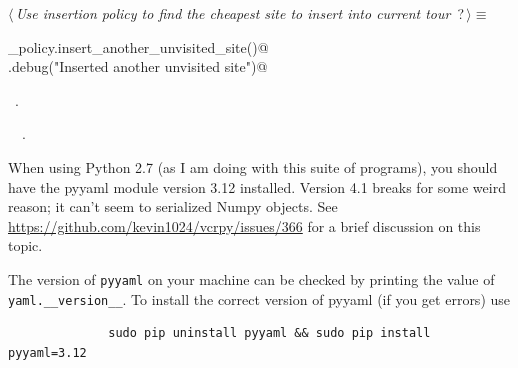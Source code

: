 \documentclass[11.5pt]{report}
\begin{document}
\begin{flushleft} \small\label{scrap25}\raggedright\small
{} $\langle\,${\itshape Use insertion policy to find the cheapest site to insert into current tour}\nobreak\ {\footnotesize {?}}$\,\rangle\equiv$
\vspace{-1ex}
\begin{list}{}{} \item
\mbox{}\verb@insertion_policy.insert_another_unvisited_site()@\\
\mbox{}\verb@logger.debug("Inserted another unvisited site")@\\
\mbox{}\verb@@{\NWsep}
\end{list}
\vspace{-1.5ex}
\footnotesize
\begin{list}{}{\setlength{\itemsep}{-\parsep}\setlength{\itemindent}{-\leftmargin}}
\item \NWtxtMacroRefIn\ .
\item \NWtxtIdentsUsed\nobreak\  \verb@logger@\nobreak\ .
\item{}
\end{list}
\vspace{4ex}
\end{flushleft}
\newchunk When using Python 2.7 (as I am doing with this suite of programs), you should have the 
pyyaml module version 3.12 installed. Version 4.1 breaks for some weird reason; it can't seem to serialized
Numpy objects. See \url{https://github.com/kevin1024/vcrpy/issues/366} for a brief discussion on this topic. 

The version of \verb|pyyaml| on your machine can be checked by printing the value of \verb|yaml.__version__|. 
To install the correct version of pyyaml (if you get errors)  use

\begin{verbatim} 
              sudo pip uninstall pyyaml && sudo pip install pyyaml=3.12
\end{verbatim}
\end{document}

